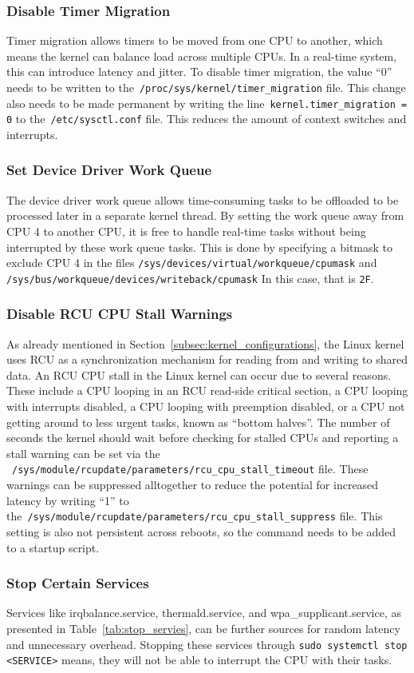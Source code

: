 \documentclass[MMR,Master,english]{twbook}
\begin{document}
\subsubsection{Disable Timer Migration}
Timer migration allows timers to be moved from one CPU to another, which means the kernel can balance load across multiple CPUs. In a real-time system, this can introduce latency and jitter. To disable timer migration, the value ``0'' needs to be written to the~\texttt{/proc/sys/kernel/timer\_migration} file. This change also needs to be made permanent by writing the line~\texttt{kernel.timer\_migration = 0} to the~\texttt{/etc/sysctl.conf} file. This reduces the amount of context switches and interrupts.
\subsubsection{Set Device Driver Work Queue}
The device driver work queue allows time-consuming tasks to be offloaded to be processed later in a separate kernel thread. By setting the work queue away from CPU 4 to another CPU, it is free to handle real-time tasks without being interrupted by these work queue tasks. This is done by specifying a bitmask to exclude CPU 4 in the files \texttt{/sys/devices/virtual/workqueue/cpumask} and \texttt{/sys/bus/workqueue/devices/writeback/cpumask} In this case, that is \texttt{2F}.
\subsubsection{Disable RCU CPU Stall Warnings}
As already mentioned in Section~\ref{subsec:kernel_configurations}, the Linux kernel uses RCU as a synchronization mechanism for reading from and writing to shared data. An RCU CPU stall in the Linux kernel can occur due to several reasons. These include a CPU looping in an RCU read-side critical section, a CPU looping with interrupts disabled, a CPU looping with preemption disabled, or a CPU not getting around to less urgent tasks, known as “bottom halves”. The number of seconds the kernel should wait before checking for stalled CPUs and reporting a stall warning can be set via the ~\texttt{/sys/module/rcupdate/parameters/rcu\_cpu\_stall\_timeout} file. These warnings can be suppressed alltogether to reduce the potential for increased latency by writing ``1'' to the~\texttt{/sys/module/rcupdate/parameters/rcu\_cpu\_stall\_suppress} file. This setting is also not persistent across reboots, so the command needs to be added to a startup script.
\clearpage
\subsubsection{Stop Certain Services}
Services like irqbalance.service, thermald.service, and wpa\_supplicant.service, as presented in Table~\ref{tab:stop_servies}, can be further sources for random latency and unnecessary overhead. Stopping these services through \texttt{sudo systemctl stop <SERVICE>} means, they will not be able to interrupt the CPU with their tasks.
\end{document}
